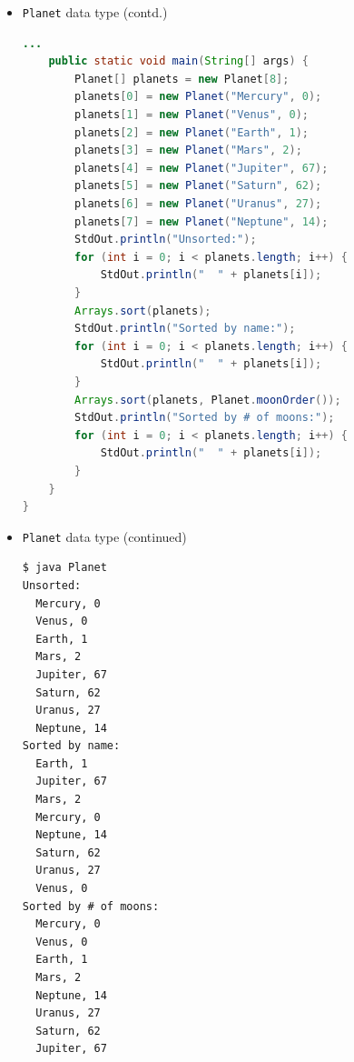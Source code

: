 \documentclass[8pt,a4paper,compress]{beamer}
\begin{document}
\begin{frame}[fragile]
\begin{itemize}
\item \lstinline{Planet} data type (contd.)
\begin{lstlisting}[language=Java]
    ...
    public static void main(String[] args) {
        Planet[] planets = new Planet[8];
        planets[0] = new Planet("Mercury", 0);
        planets[1] = new Planet("Venus", 0);
        planets[2] = new Planet("Earth", 1);
        planets[3] = new Planet("Mars", 2);
        planets[4] = new Planet("Jupiter", 67);
        planets[5] = new Planet("Saturn", 62);
        planets[6] = new Planet("Uranus", 27);
        planets[7] = new Planet("Neptune", 14);
        StdOut.println("Unsorted:");
        for (int i = 0; i < planets.length; i++) {
            StdOut.println("  " + planets[i]);
        }
        Arrays.sort(planets);
        StdOut.println("Sorted by name:");
        for (int i = 0; i < planets.length; i++) {
            StdOut.println("  " + planets[i]);
        }
        Arrays.sort(planets, Planet.moonOrder());
        StdOut.println("Sorted by # of moons:");
        for (int i = 0; i < planets.length; i++) {
            StdOut.println("  " + planets[i]);
        }
    }
}
\end{lstlisting}
\end{itemize}
\end{frame}

\begin{frame}[fragile]
\begin{itemize}
\item \lstinline{Planet} data type (continued)
\begin{lstlisting}[language={}]
$ java Planet
Unsorted:
  Mercury, 0
  Venus, 0
  Earth, 1
  Mars, 2
  Jupiter, 67
  Saturn, 62
  Uranus, 27
  Neptune, 14
Sorted by name:
  Earth, 1
  Jupiter, 67
  Mars, 2
  Mercury, 0
  Neptune, 14
  Saturn, 62
  Uranus, 27
  Venus, 0
Sorted by # of moons:
  Mercury, 0
  Venus, 0
  Earth, 1
  Mars, 2
  Neptune, 14
  Uranus, 27
  Saturn, 62
  Jupiter, 67
\end{lstlisting}
\end{itemize}
\end{frame}
\end{document}

